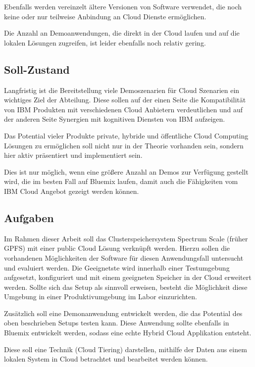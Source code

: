 Ebenfalls werden vereinzelt ältere Versionen von Software verwendet, die noch keine oder nur teilweise Anbindung an Cloud Dienste ermöglichen. 

Die Anzahl an Demoanwendungen, die direkt in der Cloud laufen und auf die lokalen Lösungen zugreifen, ist leider ebenfalls noch relativ gering. 

\subsection{Soll-Zustand}

Langfristig ist die Bereitstellung viele Demoszenarien für Cloud Szenarien ein wichtiges Ziel der Abteilung. Diese sollen auf der einen Seite die Kompatibilität von IBM Produkten mit verschiedenen Cloud Anbietern verdeutlichen und auf der anderen Seite Synergien mit kognitiven Diensten von IBM aufzeigen.

Das Potential vieler Produkte private, hybride und öffentliche Cloud Computing Lösungen zu ermöglichen soll nicht nur in der Theorie vorhanden sein, sondern hier aktiv präsentiert und implementiert sein.

Dies ist nur möglich, wenn eine größere Anzahl an Demos zur Verfügung gestellt wird, die im besten Fall auf \gls{Bluemix} laufen, damit auch die Fähigkeiten vom IBM Cloud Angebot gezeigt werden können. 

\subsection{Aufgaben}

Im Rahmen dieser Arbeit soll das Clusterspeichersystem Spectrum Scale (früher GPFS) mit einer public Cloud Lösung verknüpft werden. Hierzu sollen die vorhandenen Möglichkeiten der Software für diesen Anwendungsfall untersucht und evaluiert werden.
Die Geeignetste wird innerhalb einer Testumgebung aufgesetzt, konfiguriert und mit einem geeigneten Speicher in der Cloud erweitert werden. 
Sollte sich das Setup als sinnvoll erweisen, besteht die Möglichkeit diese Umgebung in einer Produktivumgebung im Labor einzurichten.

Zusätzlich soll eine Demonanwendung entwickelt werden, die das Potential des oben beschrieben Setups testen kann. Diese Anwendung sollte ebenfalls in \gls{Bluemix} entwickelt werden, sodass eine echte Hybrid Cloud Applikation entsteht. 

Diese soll eine Technik (Cloud Tiering) darstellen, mithilfe der Daten aus einem lokalen System in Cloud betrachtet und bearbeitet werden können.

